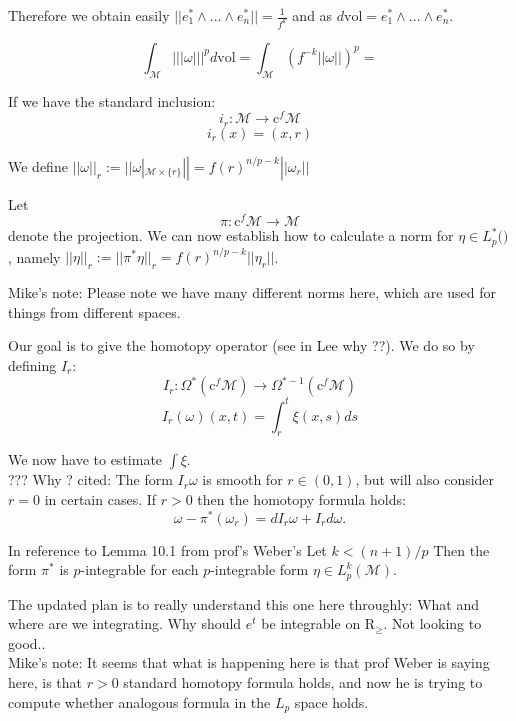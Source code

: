 \documentclass[licencjacka]{pracamgr}
\begin{document}
\normalsize

Therefore we obtain easily $||e_1^{\ast} \wedge ... \wedge e_n^\ast || =
\frac{1}{f^k}$ and as $d\mathrm{vol} = e_1^{\ast} \wedge ... \wedge e_n^\ast $.


\[
    \int_{\mathcal{M}} ||| \omega |||^p d\mathrm{vol} = 
    \int_{\mathcal{M}}  (f^{-k}|| \omega ||)^p =  
\]

If we have the standard inclusion:
\[
    i_r: \mathcal{M} \rightarrow \mathrm{c}^f \mathcal{M}
\]
\[
    i_r(x) = (x, r)
\]

We define $|| \omega ||_r := || \omega |_{\mathcal{M} \times \{r\}} ||
= f(r)^{n/p - k} ||\omega_r||$

Let
\[
    \pi:\mathrm{c}^f \mathcal{M} \rightarrow \mathcal{M}
\]
denote the projection. We can now establish how to calculate a norm
for $\eta \in L^\ast_p(\mathcal)$, namely 
$||\eta||_r := ||\pi^\ast\eta||_r = f(r)^{n/p - k} ||\eta_r||$.


\scriptsize
Mike's note: Please note we have many different norms here, which
are used for things from different spaces.
\normalsize

Our goal is to give the homotopy operator (see in Lee why ??). We do so by
defining $I_r$:
\[
  I_r: \Omega^\ast( \mathrm{c}^f \mathcal{M} ) \rightarrow
  \Omega^{\ast-1}(\mathrm{c}^f \mathcal{M} ) 
\]
\[
    I_r(\omega)(x, t) = \int_r^t \xi(x, s) ds
\]

We now have to estimate $\int \xi$. \\

??? Why ?
cited:
The form $I_r\omega$ is smooth for $r \in (0,1)$, but will also consider
$r=0$ in certain cases. If $r>0$ then the homotopy formula holds:
\[
    \omega - \pi^\ast(\omega_r) = d I_r\omega + I_rd\omega.
\] 

In reference to Lemma 10.1 from prof's Weber's
Let $k < (n+1)/p $ Then the form $\pi^\ast$ is $p$-integrable for each 
$p$-integrable form $\eta \in L^k_p(\mathcal{M})$.

The updated plan is to really understand this one here throughly:
What and where are we integrating. Why should $e^t$ be integrable 
on $\mathrm{R}_\geq$. Not looking to good.. \\



\scriptsize
Mike's note:
It seems that what is happening here is that prof Weber is saying here,
is that $r>0$ standard homotopy formula holds, and now he is trying
to compute whether analogous formula in the $L_p$ space holds.
\end{document}
